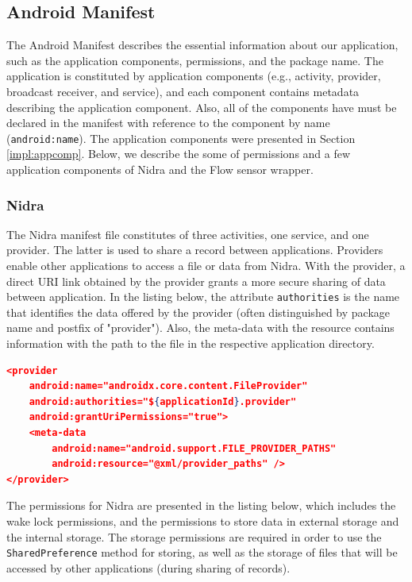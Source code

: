 \subsection{Android Manifest} \label{impl:manifest}
The Android Manifest describes the essential information about our application, such as the application components, permissions, and the package name. The application is constituted by application components (e.g., activity, provider, broadcast receiver, and service), and each component contains metadata describing the application component. Also, all of the components have must be declared in the manifest with reference to the component by name  (\verb|android:name|). The application components were presented in Section \ref{impl:appcomp}. Below, we describe the some of permissions and a few application components of Nidra and the Flow sensor wrapper.

\subsubsection{Nidra}

The Nidra manifest file constitutes of three activities, one service, and one provider. The latter is used to share a record between applications. Providers enable other applications to access a file or data from Nidra. With the provider, a direct URI link obtained by the provider grants a more secure sharing of data between application. In the listing below, the attribute \verb|authorities| is the name that identifies the data offered by the provider (often distinguished by package name and postfix of "provider"). Also, the meta-data with the resource contains information with the path to the file in the respective application directory.  

\begin{lstlisting}[language=json, caption={}, captionpos=b]
<provider
    android:name="androidx.core.content.FileProvider"
    android:authorities="${applicationId}.provider"
    android:grantUriPermissions="true">
    <meta-data
        android:name="android.support.FILE_PROVIDER_PATHS"
        android:resource="@xml/provider_paths" />
</provider>
\end{lstlisting}

The permissions for Nidra are presented in the listing below, which includes the wake lock permissions, and the permissions to store data in external storage and the internal storage. The storage permissions are required in order to use the \verb|SharedPreference| method for storing, as well as the storage of files that will be accessed by other applications (during sharing of records).

